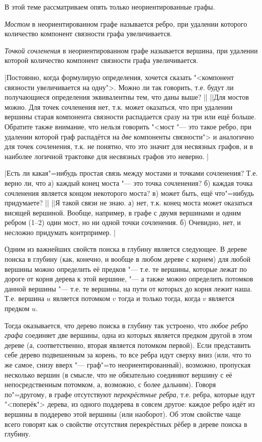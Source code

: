 
В этой теме рассматриваем опять только неориентированные графы.

\textit{Мостом} в неориентированном графе называется ребро, при удалении которого количество компонент связности графа 
увеличивается. 

\textit{Точкой сочленения} в неориентированном графе называется вершина, при удалении которой количество компонент 
связности графа увеличивается.

\task|Постоянно, когда формулирую определения, хочется сказать "< компонент связности
увеличивается на одну">. Можно ли так говорить, т.е. будут ли получающиеся определения эквивалентны
тем, что даны выше?
||
||Для мостов можно. Для точек сочленения нет, т.к. может оказаться, что при удалении вершины
старая компонента связности распадается сразу на три или ещё больше. Обратите также внимание, что нельзя говорить
"<мост "--- это такое ребро, при удалении которой граф распадётся на \textit{две} компоненты связности"> и аналогично для 
точек сочленения, т.к. не понятно, что это значит для несвязных графов, и в наиболее логичной трактовке для 
несвязных графов это неверно.
|\label{bridgeone}

\task|Есть ли какая"=нибудь простая связь между мостами и точками сочленения? Т.е. верно ли, что
а) каждый конец моста "--- это точка сочленения? б) каждая точка сочленения является концом некоторого моста? 
в) может быть, ещё что"=нибудь придумаете?
||
||Я такой связи не знаю. а) нет, т.к. конец моста может оказаться висящей вершиной.
Вообще, например, в графе с двумя вершинами и одним ребром (1--2) один мост, но ни одной точки сочленения.
б) Очевидно, нет, и несложно придумать контрпример.
|\label{bridgesandSV}

 Одним из важнейших свойств поиска в глубину является следующее.
В дереве поиска в глубину (как, конечно, и вообще в любом дереве с корнем) для любой вершины
можно определить её предков "--- т.е. те вершины, которые лежат по дороге от корня дерева к этой 
вершине, "--- а также можно определить потомков данной вершины "--- т.е. те вершины, на пути от которых до 
корня лежит наша. Т.е. вершина $u$ является потомком $v$ тогда и только тогда, когда $v$ является предком $u$.

Тогда оказывается, что дерево поиска в глубину так устроено, что \textit{любое ребро графа} соединяет 
две вершины, одна из которых является предком другой в этом дереве (а, соответственно, вторая
является потомком первой). Если представить себе дерево подвешенным за корень, то все ребра идут сверху вниз
(или, что то же самое, снизу вверх "--- граф"=то неориентированный), возможно, пропуская несколько вершин
(в смысле, что не обязательно соединяют вершину с её непосредственным потомком, а, возможно, с более дальним).
Говоря по"=другому, в графе отсутствуют \textit{перекрёстные ребра}, т.е. ребра, которые идут "<поперёк">
дерева, из одного поддерева в совсем другое: каждое ребро идёт из вершины в поддерево этой
вершины (или наоборот). Об этом свойстве чаще всего говорят как о свойстве отсутствия перекрёстных рёбер в
дереве поиска в глубину.

